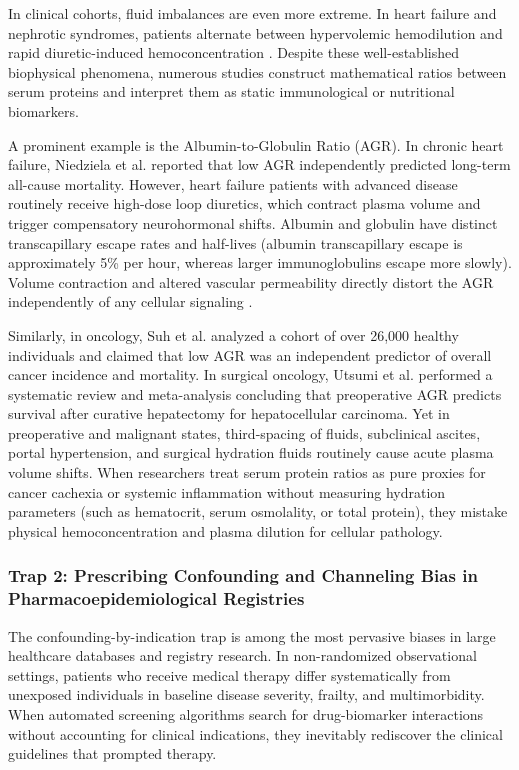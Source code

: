 \documentclass[10pt,letterpaper]{article}
\begin{document}
In clinical cohorts, fluid imbalances are even more extreme. In heart failure and nephrotic syndromes, patients alternate between hypervolemic hemodilution and rapid diuretic-induced hemoconcentration \cite{testani2010, testani2013}. Despite these well-established biophysical phenomena, numerous studies construct mathematical ratios between serum proteins and interpret them as static immunological or nutritional biomarkers.

A prominent example is the Albumin-to-Globulin Ratio (AGR). In chronic heart failure, Niedziela et al. \cite{niedziela2018} reported that low AGR independently predicted long-term all-cause mortality. However, heart failure patients with advanced disease routinely receive high-dose loop diuretics, which contract plasma volume and trigger compensatory neurohormonal shifts. Albumin and globulin have distinct transcapillary escape rates and half-lives (albumin transcapillary escape is approximately 5\% per hour, whereas larger immunoglobulins escape more slowly). Volume contraction and altered vascular permeability directly distort the AGR independently of any cellular signaling \cite{testani2013, lippi2013}. 

Similarly, in oncology, Suh et al. \cite{suh2014} analyzed a cohort of over 26,000 healthy individuals and claimed that low AGR was an independent predictor of overall cancer incidence and mortality. In surgical oncology, Utsumi et al. \cite{utsumi2026} performed a systematic review and meta-analysis concluding that preoperative AGR predicts survival after curative hepatectomy for hepatocellular carcinoma. Yet in preoperative and malignant states, third-spacing of fluids, subclinical ascites, portal hypertension, and surgical hydration fluids routinely cause acute plasma volume shifts. When researchers treat serum protein ratios as pure proxies for cancer cachexia or systemic inflammation without measuring hydration parameters (such as hematocrit, serum osmolality, or total protein), they mistake physical hemoconcentration and plasma dilution for cellular pathology.

\subsubsection{Trap 2: Prescribing Confounding and Channeling Bias in Pharmacoepidemiological Registries}
The confounding-by-indication trap is among the most pervasive biases in large healthcare databases and registry research. In non-randomized observational settings, patients who receive medical therapy differ systematically from unexposed individuals in baseline disease severity, frailty, and multimorbidity. When automated screening algorithms search for drug-biomarker interactions without accounting for clinical indications, they inevitably rediscover the clinical guidelines that prompted therapy.
\end{document}
